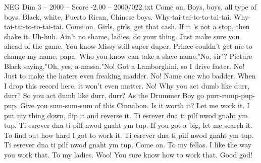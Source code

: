 \begin{textsample}{NEG Dim 3 – 2000 – Score -2.00 – 2000/022.txt}
Come on.
Boys, boys, all type of boys.
Black, white, Puerto Rican, Chinese boys.
Why-tai-tai-to-to-tai-tai.
Why-tai-tai-to-to-tai-tai.
Come on.
Girls, girls, get that cash.
If it 's not a stop, then shake it.
Uh-huh.
Ain't no shame, ladies, do your thing.
Just make sure you ahead of the game.
You know Missy still super duper.
Prince couldn't get me to change my name, papa.
Who you know can take a slave name,"No, sir"?
Picture Black saying,"Oh, yes, a-massa."No!
Got a Lamborghini, so I drive faster.
No!
Just to make the haters even freaking madder.
No!
Name one who badder.
When I drop this record here, it won't even matter.
No!
Why you act dumb like durr, durr?
So you act dumb like durr, durr?
As the Drummer Boy go purr-rump-pup-pup.
Give you sum-sum-sum of this Cinnabon.
Is it worth it?
Let me work it.
I put my thing down, flip it and reverse it.
Ti esrever dna ti pilf nwod gnaht ym tup.
Ti esrever dna ti pilf nwod gnaht ym tup.
If you got a big, let me search it.
To find out how hard I got to work it.
Ti esrever dna ti pilf nwod gnaht ym tup.
Ti esrever dna ti pilf nwod gnaht ym tup.
Come on.
To my fellas.
I like the way you work that.
To my ladies.
Woo!
You sure know how to work that.
Good god!

\end{textsample}
